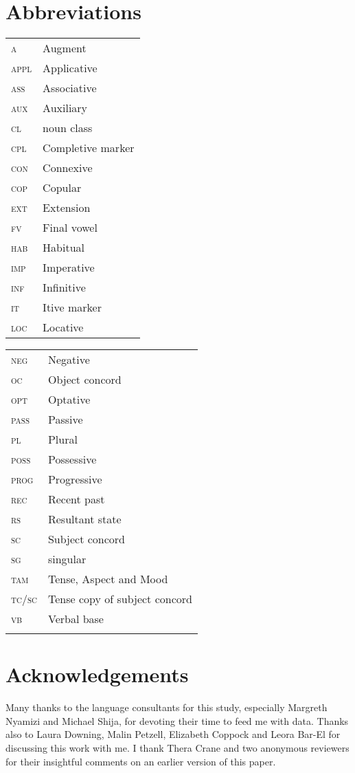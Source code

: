 \documentclass[output=paper,newtxmath,modfonts,nonflat,draftmode]{langsci/langscibook}
\begin{document}
\section*{Abbreviations} 
\noindent\begin{tabularx}{.5\textwidth}{@{}>{\scshape}lQ@{}}
a & Augment\\
appl & Applicative\\
ass & Associative\\
aux & Auxiliary\\
cl & noun class\\
cpl & Completive marker\\
con & Connexive\\
cop & Copular\\
ext & Extension\\
fv & Final vowel\\
hab & Habitual\\
imp & Imperative\\
inf & Infinitive\\
it & Itive marker\\
loc & Locative\\
\end{tabularx}%
\begin{tabularx}{.5\textwidth}{@{}>{\scshape}ll@{}}
neg & Negative\\
oc & Object concord\\
opt & Optative\\
pass & Passive\\
pl & Plural\\
poss & Possessive\\
prog & Progressive\\
rec & Recent past\\
rs & Resultant state\\
sc & Subject concord\\
sg & singular\\
tam & Tense, Aspect and Mood\\
tc/sc & Tense copy of subject concord\\
vb & Verbal base\\
\\
\end{tabularx}

\section*{Acknowledgements}\largerpage[2]
Many thanks to the language consultants for this study, especially Margreth Nyamizi and Michael Shija, for devoting their time to feed me with data. Thanks also to Laura Downing, Malin Petzell, Elizabeth Coppock and Leora Bar-El for discussing this work with me. I thank Thera Crane and two anonymous reviewers for their insightful comments on an earlier version of this paper.  

{\sloppy\printbibliography[heading=subbibliography,notkeyword=this]}
\end{document}
